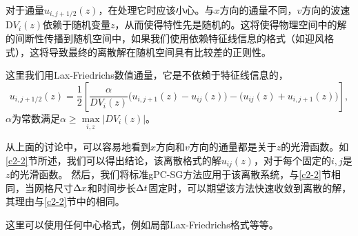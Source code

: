 
对于通量$u_{i, j+1/2}(z)$，在处理它时应该小心。与$x$方向的通量不同，$v$方向的波速$\mathrm{D}V_i(z)$依赖于随机变量$z$，从而使得特性先是随机的。这将使得物理空间中的解的间断性传播到随机空间中，如果我们使用依赖特征线信息的格式（如迎风格式），这将导致最终的离散解在随机空间具有比较差的正则性。

这里我们用Lax-Friedrichs数值通量，它是不依赖于特征线信息的，
\begin{equation}\label{v-direction}
  u_{i,j+1/2}(z) = \frac{1}{2}\left[\frac{\alpha}{DV_i(z)}\big(u_{i,j+1}(z) - u_{ij}(z)\big) - \big(u_{ij}(z) + u_{i,j+1}(z)\big)\right],
\end{equation}
$\alpha$为常数满足$\alpha\geq \max\limits_{i, z}|DV_i(z)|$。


从上面的讨论中，可以容易地看到$x$方向和$v$方向的通量都是关于$z$的光滑函数。如\ref{c2-2}节所述，我们可以得出结论，该离散格式的解$u_{ij}(z)$，对于每个固定的$i,j$是$z$的光滑函数。 然后，我们将标准gPC-SG方法应用于该离散系统，与\ref{c2-2}节相同，当网格尺寸$\Delta x$和时间步长$\Delta t$固定时，可以期望该方法快速收敛到离散的解，其理由与\ref{c2-2}节中的相同。

\begin{rem}
这里可以使用任何中心格式，例如局部Lax-Friedrichs格式等等。
\end{rem}
